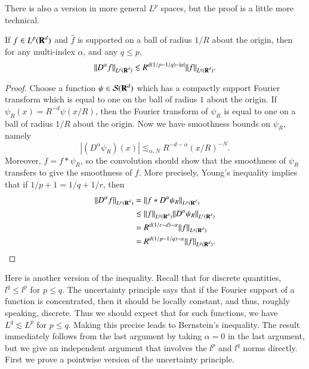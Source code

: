 There is also a version in more general $L^p$ spaces, but the proof is a little more technical.

\begin{lemma}
    If $f \in L^p(\operatorname{\mathbf{R}}^d)$ and $\widehat{f}$ is supported on a ball of radius $1/R$ about the origin, then for any multi-index $\alpha$, and any $q \leq p$,
    \[ \| D^\alpha f \|_{L^p(\operatorname{\mathbf{R}}^d)} \lesssim R^{d(1/p - 1/q) - |\alpha|} \| f \|_{L^q(\operatorname{\mathbf{R}}^d)}. \]
\end{lemma}
\begin{proof}
    Choose a function $\psi \in \mathcal{S}(\operatorname{\mathbf{R}}^d)$ which has a compactly support Fourier transform which is equal to one on the ball of radius $1$ about the origin. If $\psi_R(x) = R^{-d} \psi(x / R)$, then the Fourier transform of $\psi_R$ is equal to one on a ball of radius $1/R$ about the origin. Now we have smoothness bounds on $\psi_R$, namely
    \[ |(D^\alpha \psi_R)(x)| \lesssim_{\alpha,N} R^{-d-\alpha} (x/R)^{-N}. \]
    Moreover, $f = f * \psi_R$, so the convolution should show that the smoothness of $\psi_R$ transfers to give the smoothness of $f$. More precisely, Young's inequality implies that if $1/p + 1 = 1/q + 1/r$, then
    \begin{align*}
        \| D^\alpha f \|_{L^p(\operatorname{\mathbf{R}}^d)} &= \| f * D^\alpha \psi_R \|_{L^p(\operatorname{\mathbf{R}}^d)}\\
        &\lesssim \| f \|_{L^q(\operatorname{\mathbf{R}}^d)} \| D^\alpha \psi_R \|_{L^r(\operatorname{\mathbf{R}}^d)}\\
        &= R^{d(1/r - d) - \alpha} \| f \|_{L^q(\operatorname{\mathbf{R}}^d)}\\
        &= R^{d(1/p - 1/q) - \alpha} \| f \|_{L^q(\operatorname{\mathbf{R}}^d)}. \qedhere
    \end{align*}
\end{proof}

Here is another version of the inequality. Recall that for discrete quantities, $l^q \leq l^p$ for $p \leq q$. The uncertainty principle says that if the Fourier support of a function is concentrated, then it should be locally constant, and thus, roughly speaking, discrete. Thus we should expect that for such functions, we have $L^q \lesssim L^p$ for $p \leq q$. Making this precise leads to Bernstein's inequality. The result immediately follows from the last argument by taking $\alpha = 0$ in the last argument, but we give an independent argument that involves the $l^p$ and $l^q$ norms directly. First we prove a pointwise version of the uncertainty principle.


